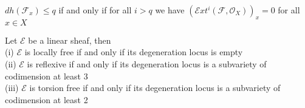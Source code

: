 \documentclass[
	oldfontcommands,
	sumario=abnt-6027-2012,
	12pt,			%
	openright,		%
	oneside,		%
	a4paper,		%
	english,		%
	brazil			%
	]{imecc-unicamp}
\begin{document}
\begin{lemma}\cite[Okonek, Schneider \& Spindler, Lemma 1.1.1]{Okonek}\label{dhokonek}
$dh(\mathcal{F}_x) \leq q$ if and only if for all $i>q$ we have $(\mathcal{E}xt^i(\mathcal{F},\mathcal{O}_X))_x=0$ for all $x \in X$
\end{lemma}
\begin{lemma}\cite[Jardim]{jardim}
Let $\mathcal{E}$ be a linear sheaf, then \\
(i) $\mathcal{E}$ is locally free if and only if its degeneration locus is empty \\
(ii) $\mathcal{E}$ is reflexive if and only if its degeneration locus is a subvariety of codimension at least 3 \\
(iii) $\mathcal{E}$ is torsion free if and only if its degeneration locus is a subvariety of codimension at least 2
\end{lemma}
\end{document}
